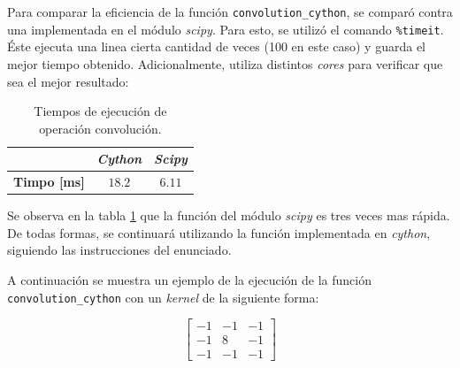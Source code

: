 \documentclass[12pt, letterpaper]{article}
\begin{document}
\par Para comparar la eficiencia de la función \texttt{convolution\_cython}, se comparó contra una implementada en el módulo \textit{scipy}. Para esto, se utilizó el comando \texttt{\%timeit}. Éste ejecuta una linea cierta cantidad de veces (100 en este caso) y guarda el mejor tiempo obtenido. Adicionalmente, utiliza distintos \textit{cores} para verificar que sea el mejor resultado: 

\begin{table}[H]
  \centering
  \begin{tabular}{|c|c|c|}
  \hline
                          & \textit{\textbf{Cython}} & \textit{\textbf{Scipy}} \\ \hline
  \textbf{Timpo {[}ms{]}} & $18.2$                     & $6.11$                    \\ \hline
  \end{tabular}
  \caption{Tiempos de ejecución de operación convolución.}
  \label{profile}
\end{table}

\par Se observa en la tabla \ref{profile} que la función del módulo \textit{scipy} es tres veces mas rápida. De todas formas, se continuará utilizando la función implementada en \textit{cython}, siguiendo las instrucciones del enunciado.


\par A continuación se muestra un ejemplo de la ejecución de la función \texttt{convolution\_cython} con un \textit{kernel} de la siguiente forma:

\begin{equation}
\begin{bmatrix}
-1 & -1 & -1 \\ 
-1 & 8 & -1 \\ 
-1 & -1 & -1
\end{bmatrix}
\end{equation}
\end{document}
